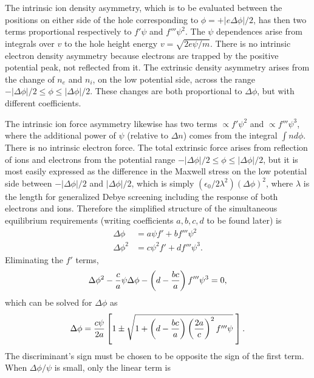 \documentclass[12pt]{article}
\begin{document}
The intrinsic ion density asymmetry, which is to be evaluated between
the positions on either side of the hole corresponding to
$\phi=+|e\Delta \phi|/2$, has then two terms proportional respectively
to $f'\psi$ and $f'''\psi^2$. The $\psi$ dependences arise from
integrals over $v$ to the hole height energy
$v=\sqrt{2e\psi/m}$. There is no intrinsic electron density asymmetry
because electrons are trapped by the positive potential peak, not
reflected from it. The extrinsic density asymmetry arises from the
change of $n_e$ and $n_i$, on the low potential side, across the range
$-|\Delta\phi|/2 \le \phi \le |\Delta\phi|/2$. These changes are both
proportional to $\Delta\phi$, but with different coefficients.

The intrinsic ion force asymmetry likewise has two terms
$\propto f'\psi^2$ and $\propto f'''\psi^3$, where the additional
power of $\psi$ (relative to $\Delta n$) comes from the integral
$\int n d\phi$. There is no intrinsic electron force. The total
extrinsic force arises from reflection of ions and electrons from the
potential range $-|\Delta\phi|/2 \le \phi \le |\Delta\phi|/2$, but it
is most easily expressed as the difference in the Maxwell stress on
the low potential side between $-|\Delta\phi|/2$ and $|\Delta\phi|/2$,
which is simply $(\epsilon_0/2\lambda^2)(\Delta\phi)^2$, where
$\lambda$ is the length for generalized Debye screening including the
response of both electrons and ions. Therefore the simplified structure of the
simultaneous equilibrium requirements (writing coefficients
$a,b,c,d$ to be found later) is
\begin{equation}
  \label{eq:simul}
  \begin{split}
    \Delta\phi &= a \psi f'+ b f'''\psi^2\\
    \Delta\phi^2 &= c \psi^2f'+ d f'''\psi^3.
    \end{split}
\end{equation}
Eliminating the $f'$ terms,
\begin{equation}
  \label{eq:Delphieq}
  \Delta\phi^2-{c\over a}\psi\Delta\phi-
  \left(d- {bc\over a}\right) f''' \psi^3=0,
\end{equation}
which can be solved for $\Delta\phi$ as
\begin{equation}
  \label{eq:Dpsolve}
  \Delta\phi={c\psi\over 2 a}\left[1\pm\sqrt{1+ \left(d
    - {bc\over a}\right)\left(2a\over c\right)^2f'''\psi}\;\right]
  .
\end{equation}
The discriminant's sign must be chosen to be opposite the sign of the
first term.  When $\Delta\phi/\psi$ is small, only the linear term is
\end{document}
